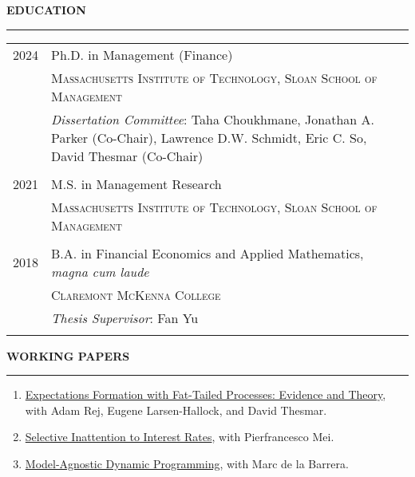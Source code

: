 \documentclass[a4paper, 10pt]{article}
\newcounter{mycounter}
\newcommand{\cvsec}[1]
{
	\needspace{2\baselineskip}
	\noindent \textbf{#1}
	
	\vspace{2pt}
	
	\hrule
	
	\bigskip
}
\newcommand{\cvitem}[2]{#1 & #2 \\ & \\}
\newenvironment{cvchrono}[1]
{
	\cvsec{#1}
	\begin{tabu} to \linewidth {X[1,l]X[6,l]} 
}
{
	\end{tabu}
}
\newenvironment{cvcontinue}[1]
{
	\cvsec{#1}
	\begin{enumerate}
		\setcounter{enumi}{\themycounter}
	}
	{
	\setcounter{mycounter}{\theenumi}
	\end{enumerate}
}
\begin{document}
\begin{cvchrono}{EDUCATION}
	\cvitem{2024}{Ph.D. in Management (Finance) \\
		& \textsc{Massachusetts Institute of Technology, Sloan School of Management} \\
		& \emph{Dissertation Committee}: Taha Choukhmane, Jonathan A. Parker (Co-Chair), Lawrence D.W. Schmidt, Eric C. So, David Thesmar (Co-Chair)
		} 
	\cvitem{2021}{M.S. in Management Research \\
		& \textsc{Massachusetts Institute of Technology, Sloan School of Management}
		} 
	\cvitem{2018}{B.A. in Financial Economics and Applied Mathematics, \emph{magna cum laude} \\
		& \textsc{Claremont McKenna College} \\
		& \emph{Thesis Supervisor}: Fan Yu
		}
\end{cvchrono}

\begin{cvcontinue}{WORKING PAPERS}
	\item \href{https://www.timdesilva.me/files/papers/fat_tails.pdf}{Expectations Formation with Fat-Tailed Processes: Evidence and Theory}, with Adam Rej, Eugene Larsen-Hallock, and David Thesmar.
	\item \href{https://www.timdesilva.me/files/papers/si.pdf}{Selective Inattention to Interest Rates}, with Pierfrancesco Mei.
	\item \href{https://www.timdesilva.me/files/papers/agnostic_dp.pdf}{Model-Agnostic Dynamic Programming}, with Marc de la Barrera.
\end{cvcontinue}
\end{document}
